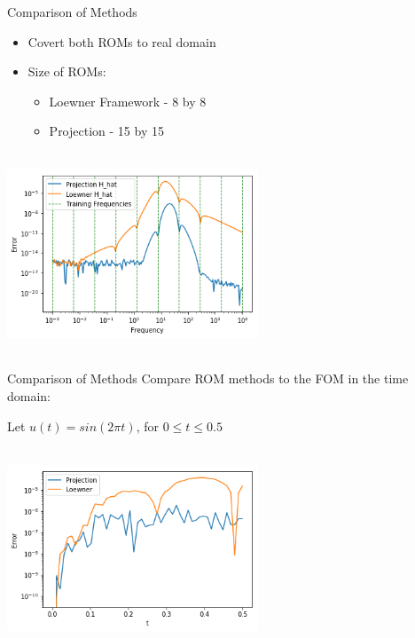 \begin{frame}{Comparison of Methods}
\begin{itemize}
    \item Covert both ROMs to real domain\\
    \bigskip
    \item Size of ROMs: \\
    \begin{itemize}
        \item Loewner Framework - 8 by 8
        \item Projection - 15 by 15
    \end{itemize}
\end{itemize}

\centering
\includegraphics[width=7.5cm, height= 6cm]{comparison1.png}
\end{frame}

\begin{frame}{Comparison of Methods}
Compare ROM methods to the FOM in the time domain:\\
\bigskip
\begin{center}
 Let $u(t) = sin(2 \pi t)$, for $0 \leq t \leq 0.5$   
\end{center}

\centering
\includegraphics[width=7.5cm, height= 6cm]{comparison2.png}
\end{frame}
